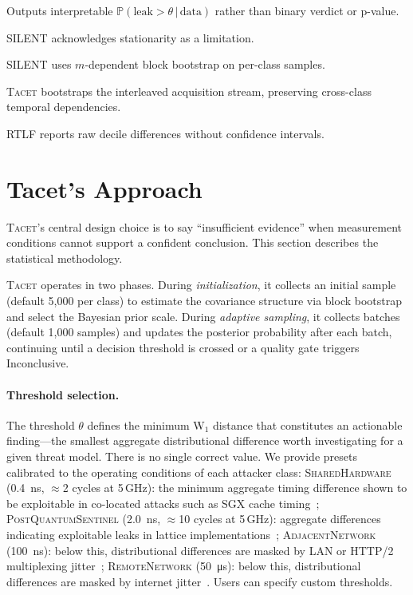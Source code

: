 \documentclass[letterpaper,twocolumn,10pt]{article}
\newcommand{\tacet}{\textsc{Tacet}\xspace}
\newcommand{\rtlf}{\textsc{RTLF}\xspace}
\newcommand{\silent}{\textsc{SILENT}\xspace}
\newcommand{\prob}[1]{\mathbb{P}(#1)}
\newcommand{\given}{\,|\,}
\newcommand{\ns}[1]{\SI{#1}{\nano\second}}
\newcommand{\us}[1]{\SI{#1}{\micro\second}}
\begin{document}
\begin{table}[ht]
\begin{threeparttable}
\begin{tablenotes}
\item[2] Outputs interpretable $\prob{\text{leak} > \theta \given \text{data}}$ rather than binary verdict or p-value.
\item[3] \silent acknowledges stationarity as a limitation.
\item[4] \silent uses $m$-dependent block bootstrap on per-class samples.
\item[5] \tacet bootstraps the interleaved acquisition stream, preserving cross-class temporal dependencies.
\item[6] \rtlf reports raw decile differences without confidence intervals.
\end{tablenotes}
\end{threeparttable}
\end{table}

\section{Tacet's Approach}
\label{sec:approach}

\tacet's central design choice is to say ``insufficient evidence'' when measurement
conditions cannot support a confident conclusion. This section describes the
statistical methodology.

\tacet operates in two phases. During \emph{initialization}, it collects an initial
sample (default 5,000 per class) to estimate the covariance structure via block
bootstrap and select the Bayesian prior scale. During \emph{adaptive sampling}, it
collects batches (default 1,000 samples) and updates the posterior probability
after each batch, continuing until a decision threshold is crossed or a quality
gate triggers Inconclusive.

\paragraph{Threshold selection.}
The threshold $\theta$ defines the minimum W$_1$ distance that constitutes an
actionable finding---the smallest aggregate distributional difference worth
investigating for a given threat model. There is no single correct value. We
provide presets calibrated to the operating conditions of each attacker class:
%
\textsc{SharedHardware} (\ns{0.4}, $\approx$2 cycles at 5\,GHz): the minimum
aggregate timing difference shown to be exploitable in co-located attacks such
as SGX cache timing~\cite{sgxtiming};
%
\textsc{PostQuantumSentinel} (\ns{2.0}, $\approx$10 cycles at 5\,GHz): aggregate
differences indicating exploitable leaks in lattice implementations~\cite{kyberslash};
%
\textsc{AdjacentNetwork} (\ns{100}): below this, distributional differences are
masked by LAN or HTTP/2 multiplexing jitter~\cite{timeless};
%
\textsc{RemoteNetwork} (\us{50}): below this, distributional differences are masked
by internet jitter~\cite{crosby2009}.
Users can specify custom thresholds.
\end{document}
